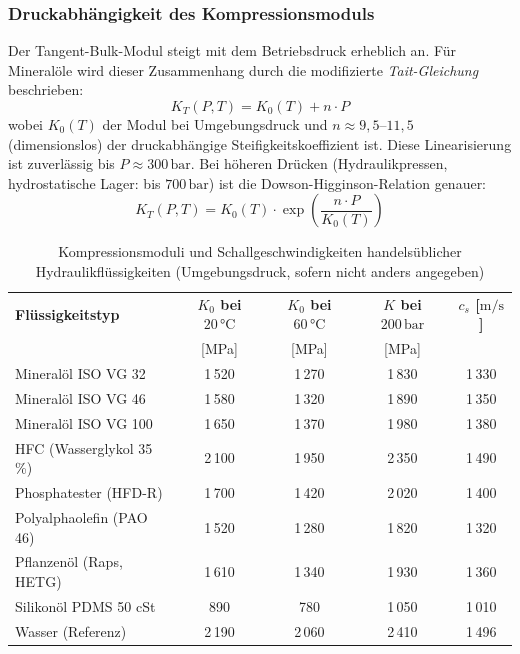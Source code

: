 ﻿\documentclass[a4paper,12pt]{scrreprt}
\theoremstyle{definition}
\begin{document}
\subsubsection{Druckabhängigkeit des Kompressionsmoduls}

Der Tangent-Bulk-Modul steigt mit dem Betriebsdruck erheblich an. Für
Mineralöle wird dieser Zusammenhang durch die modifizierte
\emph{Tait-Gleichung} beschrieben:
\begin{equation}
  K_T(P, T) = K_0(T) + n \cdot P
  \label{eq:tait_linear}
\end{equation}
wobei $K_0(T)$ der Modul bei Umgebungsdruck und $n \approx 9{,}5$--$11{,}5$
(dimensionslos) der druckabhängige Steifigkeitskoeffizient ist. Diese
Linearisierung ist zuverlässig bis $P \approx 300\,\mathrm{bar}$. Bei höheren
Drücken (Hydraulikpressen, hydrostatische Lager: bis $700\,\mathrm{bar}$)
ist die Dowson-Higginson-Relation genauer:
\begin{equation}
  K_T(P, T) = K_0(T) \cdot \exp\!\left(\frac{n \cdot P}{K_0(T)}\right)
  \label{eq:dowson_higginson}
\end{equation}

\begin{table}[H]
  \centering
  \caption{Kompressionsmoduli und Schallgeschwindigkeiten handelsüblicher
    Hydraulikflüssigkeiten (Umgebungsdruck, sofern nicht anders angegeben)}
  \label{tab:bulk_moduli}
  \begin{tabular}{lcccc}
    \toprule
    \textbf{Flüssigkeitstyp}
      & \textbf{$K_0$ bei $20\, °\mathrm{C}$}
      & \textbf{$K_0$ bei $60\, °\mathrm{C}$}
      & \textbf{$K$ bei $200\,\mathrm{bar}$}
      & \textbf{$c_s$ [$\mathrm{m/s}$]} \\
      & [MPa] & [MPa] & [MPa] & \\
    \midrule
    Mineralöl ISO VG 32        & 1\,520 & 1\,270 & 1\,830 & 1\,330 \\
    Mineralöl ISO VG 46        & 1\,580 & 1\,320 & 1\,890 & 1\,350 \\
    Mineralöl ISO VG 100       & 1\,650 & 1\,370 & 1\,980 & 1\,380 \\
    HFC (Wasserglykol 35\,\%)  & 2\,100 & 1\,950 & 2\,350 & 1\,490 \\
    Phosphatester (HFD-R)      & 1\,700 & 1\,420 & 2\,020 & 1\,400 \\
    Polyalphaolefin (PAO 46)   & 1\,520 & 1\,280 & 1\,820 & 1\,320 \\
    Pflanzenöl (Raps, HETG)    & 1\,610 & 1\,340 & 1\,930 & 1\,360 \\
    Silikonöl PDMS 50 cSt      &   890  &   780  & 1\,050 & 1\,010 \\
    Wasser (Referenz)          & 2\,190 & 2\,060 & 2\,410 & 1\,496 \\
    \bottomrule
  \end{tabular}
\end{table}
\end{document}
